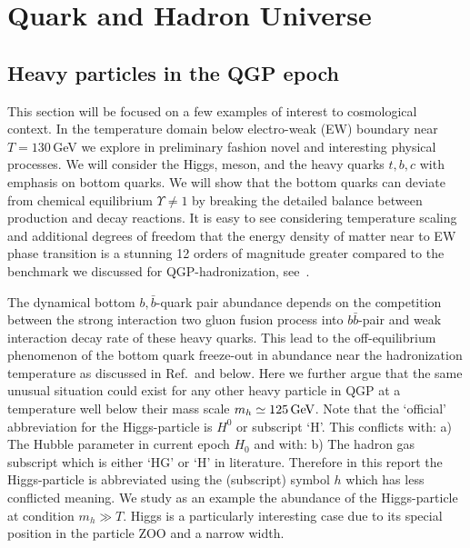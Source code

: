 \section{Quark and Hadron Universe}\label{part2}
\subsection{Heavy particles in the QGP epoch}
\label{HiggsQGP}
This section will be focused on a few examples of interest to cosmological context. In the temperature domain below electro-weak (EW) boundary near $T=130$\,GeV we explore in preliminary fashion novel and interesting physical processes. We will consider the Higgs, meson, and the heavy quarks $t,b,c$ with emphasis on bottom quarks. We will show that the bottom quarks can deviate from chemical equilibrium $\Upsilon\neq 1$ by breaking the detailed balance between production and decay reactions. It is easy to see considering temperature scaling and additional degrees of freedom that the energy density of matter near to EW phase transition is a stunning 12 orders of magnitude greater compared to the benchmark we discussed for QGP-hadronization, see~.
 
The dynamical bottom $ b,\bar b$-quark pair abundance depends on the competition between the strong interaction two gluon fusion process into $b\bar b$-pair and weak interaction decay rate of these heavy quarks. This lead to the off-equilibrium phenomenon of the bottom quark freeze-out in abundance near the hadronization temperature as discussed in Ref.\,\cite{Yang:2020nne} and below. Here we further argue that the same unusual situation could exist for any other heavy particle in QGP at a temperature well below their mass scale $m_h\simeq 125\text{\,GeV}$. {\color{blue}Note that the `official' abbreviation for the Higgs-particle is $H^0$ or subscript `H'. This conflicts with: a) The Hubble parameter in current epoch $H_0$ and with: b) The hadron gas subscript which is either `HG' or `H' in literature. Therefore in this report the Higgs-particle is abbreviated using the (subscript) symbol $h$ which has less conflicted meaning.} We study as an example the abundance of the Higgs-particle at condition $m_h\gg T$. Higgs is a particularly interesting case due to its special position in the particle ZOO and a narrow width.

